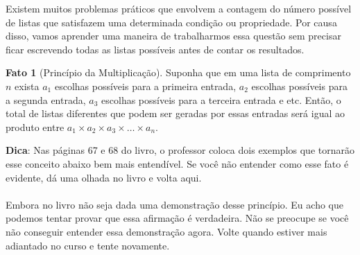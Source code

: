\documentclass[a4paper,11pt]{book}
\theoremstyle{definition}
\theoremstyle{break}
\newtheorem{fact}{Fato}[section]
\begin{document}
Existem muitos problemas práticos que envolvem a contagem do número possível de listas que satisfazem uma determinada condição ou propriedade. Por causa disso, vamos aprender uma maneira de trabalharmos essa questão sem precisar ficar escrevendo todas as listas possíveis antes de contar os resultados.

\begin{fact}[Princípio da Multiplicação]
Suponha que em uma lista de comprimento $n$ exista $a_1$ escolhas possíveis para a primeira entrada, $a_2$ escolhas possíveis para a segunda entrada, $a_3$ escolhas possíveis para a terceira entrada e etc. Então, o total de listas diferentes que podem ser geradas por essas entradas será igual ao produto entre $a_1 \times a_2 \times a_3 \times \dots \times a_n$. 
\end{fact}

\textbf{Dica}: Nas páginas 67 e 68 do livro, o professor coloca dois exemplos que tornarão esse conceito abaixo bem mais entendível. Se você não entender como esse fato é evidente, dá uma olhada no livro e volta aqui.
\\
\\
Embora no livro não seja dada uma demonstração desse princípio. Eu acho que podemos tentar provar que essa afirmação é verdadeira. Não se preocupe se você não conseguir entender essa demonstração agora. Volte quando estiver mais adiantado no curso e tente novamente.
\end{document}
